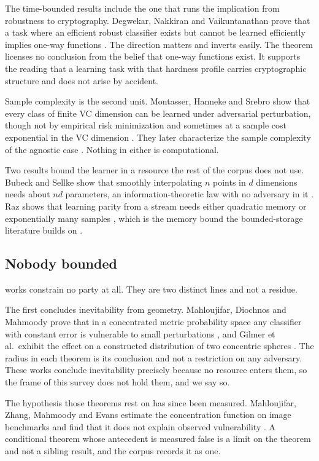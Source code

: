 The time-bounded results include the one that runs the implication from
robustness to cryptography. Degwekar, Nakkiran and Vaikuntanathan prove that a
task where an efficient robust classifier exists but cannot be learned
efficiently implies one-way functions \cite{DNV19}. The direction matters and
inverts easily. The theorem licenses no conclusion from the belief that
one-way functions exist. It supports the reading that a learning task with
that hardness profile carries cryptographic structure and does not arise by
accident.

Sample complexity is the second unit. Montasser, Hanneke and Srebro show that
every class of finite VC dimension can be learned under adversarial
perturbation, though not by empirical risk minimization and sometimes at a
sample cost exponential in the VC dimension \cite{MHS19}. They later
characterize the sample complexity of the agnostic case \cite{MHS22}. Nothing
in either is computational.

Two results bound the learner in a resource the rest of the corpus does not
use. Bubeck and Sellke show that smoothly interpolating $n$ points in $d$
dimensions needs about $nd$ parameters, an information-theoretic law with no
adversary in it \cite{BS21}. Raz shows that learning parity from a stream
needs either quadratic memory or exponentially many samples \cite{Raz16},
which is the memory bound the bounded-storage literature builds on
\cite{GZ19}.

\subsection{Nobody bounded}
\label{sec:lit-none}

\NumUnstated{} works constrain no party at all. They are two distinct lines and
not a residue.

The first concludes inevitability from geometry. Mahloujifar, Diochnos and
Mahmoody prove that in a concentrated metric probability space any classifier
with constant error is vulnerable to small perturbations \cite{MDM19}, and
Gilmer et al.\ exhibit the effect on a constructed distribution of two
concentric spheres \cite{GMFSRWG18}. The radius in each theorem is its
conclusion and not a restriction on any adversary. These works conclude
inevitability precisely because no resource enters them, so the frame of this
survey does not hold them, and we say so.

The hypothesis those theorems rest on has since been measured. Mahloujifar,
Zhang, Mahmoody and Evans estimate the concentration function on image
benchmarks and find that it does not explain observed vulnerability
\cite{MZME19}. A conditional theorem whose antecedent is measured false is a
limit on the theorem and not a sibling result, and the corpus records it as
one.

